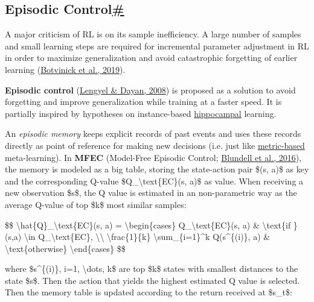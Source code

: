 \subsection{\texorpdfstring{Episodic Control\hyperref[episodic-control]{\#}}{Episodic Control\#}}\label{episodic-control}

A major criticism of RL is on its sample inefficiency. A large number of samples and small learning steps are required for incremental parameter adjustment in RL in order to maximize generalization and avoid catastrophic forgetting of earlier learning (\href{https://www.cell.com/trends/cognitive-sciences/fulltext/S1364-6613(19)30061-0}{Botvinick et al., 2019}).

\textbf{Episodic control} (\href{http://papers.nips.cc/paper/3311-hippocampal-contributions-to-control-the-third-way.pdf}{Lengyel \& Dayan, 2008}) is proposed as a solution to avoid forgetting and improve generalization while training at a faster speed. It is partially inspired by hypotheses on instance-based \href{https://en.wikipedia.org/wiki/Hippocampus}{hippocampal} learning.

An \emph{episodic memory} keeps explicit records of past events and uses these records directly as point of reference for making new decisions (i.e. just like \href{https://lilianweng.github.io/posts/2018-11-30-meta-learning/\#metric-based}{metric-based} meta-learning). In \textbf{MFEC} (Model-Free Episodic Control; \href{https://arxiv.org/abs/1606.04460}{Blundell et al., 2016}), the memory is modeled as a big table, storing the state-action pair \$(s, a)\$ as key and the corresponding Q-value \$Q\_\textbackslash text\{EC\}(s, a)\$ as value. When receiving a new observation \$s\$, the Q value is estimated in an non-parametric way as the average Q-value of top \$k\$ most similar samples:

\$\$ \textbackslash hat\{Q\}\_\textbackslash text\{EC\}(s, a) = \textbackslash begin\{cases\} Q\_\textbackslash text\{EC\}(s, a) \& \textbackslash text\{if \} (s,a) \textbackslash in Q\_\textbackslash text\{EC\}, \textbackslash\textbackslash{} \textbackslash frac\{1\}\{k\} \textbackslash sum\_\{i=1\}\^{}k Q(s\^{}\{(i)\}, a) \& \textbackslash text\{otherwise\} \textbackslash end\{cases\} \$\$

where \$s\^{}\{(i)\}, i=1, \textbackslash dots, k\$ are top \$k\$ states with smallest distances to the state \$s\$. Then the action that yields the highest estimated Q value is selected. Then the memory table is updated according to the return received at \$s\_t\$:


